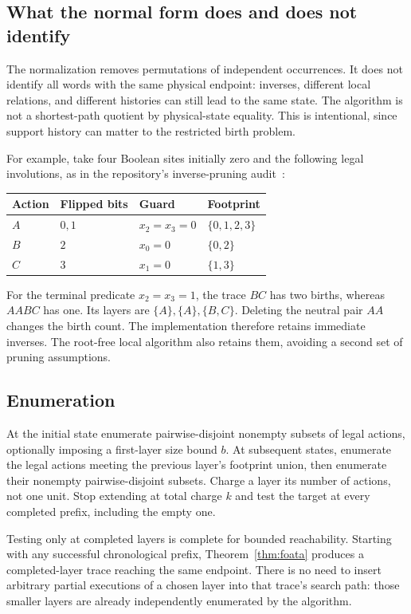 \documentclass[11pt]{article}
\theoremstyle{definition}
\begin{document}
\subsection{What the normal form does and does not identify}

The normalization removes permutations of independent occurrences. It does
not identify all words with the same physical endpoint: inverses, different
local relations, and different histories can still lead to the same state.
The algorithm is not a shortest-path quotient by physical-state equality.
This is intentional, since support history can matter to the restricted
birth problem.

For example, take four Boolean sites initially zero and the following legal
involutions, as in the repository's inverse-pruning audit~\cite{repo-causal}:
\begin{center}
\begin{tabular}{llll}
\toprule
Action & Flipped bits & Guard & Footprint\\
\midrule
$A$ & $0,1$ & $x_2=x_3=0$ & $\{0,1,2,3\}$\\
$B$ & $2$ & $x_0=0$ & $\{0,2\}$\\
$C$ & $3$ & $x_1=0$ & $\{1,3\}$\\
\bottomrule
\end{tabular}
\end{center}
For the terminal predicate $x_2=x_3=1$, the trace $BC$ has two births,
whereas $AABC$ has one. Its layers are $\{A\},\{A\},\{B,C\}$.
Deleting the neutral pair $AA$ changes the birth count. The implementation
therefore retains immediate inverses. The root-free local algorithm also
retains them, avoiding a second set of pruning assumptions.

\subsection{Enumeration}

At the initial state enumerate pairwise-disjoint nonempty subsets of legal
actions, optionally imposing a first-layer size bound $b$. At subsequent
states, enumerate the legal actions meeting the previous layer's footprint
union, then enumerate their nonempty pairwise-disjoint subsets. Charge a
layer its number of actions, not one unit. Stop extending at total charge
$k$ and test the target at every completed prefix, including the empty one.

Testing only at completed layers is complete for bounded reachability.
Starting with any successful chronological prefix, Theorem~\ref{thm:foata}
produces a completed-layer trace reaching the same endpoint. There is no
need to insert arbitrary partial executions of a chosen layer into that
trace's search path: those smaller layers are already independently
enumerated by the algorithm.
\end{document}
